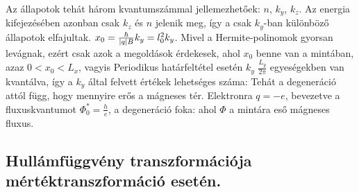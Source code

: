     Az állapotok tehát három kvantumszámmal jellemezhetőek: $n$, $k_y$, $k_z$. Az energia kifejezésében azonban csak $k_z$ és $n$ jelenik meg, így a csak $k_y$-ban különböző állapotok elfajultak. $x_0= \frac{\hbar}{\left\lvert q\right\rvert B}k_y=l_0^2 k_y$. Mivel a Hermite-polinomok gyorsan levágnak, ezért csak azok a megoldások érdekesek, ahol $x_0$ benne van a mintában, azaz $0<x_0<L_x$, vagyis 
    Periodikus határfeltétel esetén $k_y$ $\frac{L_y}{2\pi}$ egyeségekben van kvantálva, így a $k_y$ által felvett értékek lehetséges száma:
    Tehát a degeneráció attól függ, hogy mennyire erős a mágneses tér. Elektronra $q=-e$, bevezetve a fluxuskvantumot $\Phi_0^*=\frac{h}{e}$, a degeneráció foka:
    ahol $\Phi$ a mintára eső mágneses fluxus.
    
    
  
  \subsection{Hullámfüggvény transzformációja mértéktranszformáció esetén. }
   
